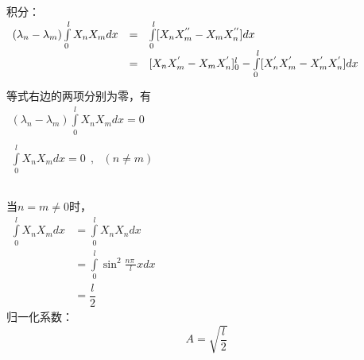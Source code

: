 \begin{frame}
	\frametitle{}	
	积分：\\
	$ \begin{array}{llll}
		(\lambda_n-\lambda_m) \int\limits_{0 }^{l}  X_n X_m dx &= & \int\limits_{0 }^{l}  [X_nX_m ^{''}-X_mX_n ^{''} ] dx\\   \vspace{0.3cm}
		&=&  [X_nX_m ^{'}-X_mX_n ^{'} ]_0 ^{l} - \int\limits_{0 }^{l}  [X_n ^{'} X_m ^{'}-X_m ^{'} X_n ^{'} ] dx \\   
	\end{array}$ \\
	等式右边的两项分别为零，有\\
	$ \begin{array}{llll}
		(\lambda_n-\lambda_m) \int\limits_{0 }^{l}  X_n X_m dx=0 \\   
	\end{array}$ \\
	$ \begin{array}{llll}
		\int\limits_{0 }^{l}  X_n X_m dx=0 ~~,~~~ (n\ne m)\\   
	\end{array}$ 
\end{frame}	

\begin{frame}
	\frametitle{}	
	当$n= m \ne 0$时， \\   
	$ \begin{array}{llll}
		\int\limits_{0 }^{l}  X_n X_m dx&= \int\limits_{0 }^{l}  X_n X_n dx \\
		&= \int\limits_{0 }^{l}   \sin ^2  \frac{n\pi~}{l} x dx \\
		&=  \dfrac{l}{2}  
	\end{array}$ \\
	归一化系数：
	\begin{equation*}
		A=\sqrt{\frac{l}{2}}
	\end{equation*}
\end{frame}	

